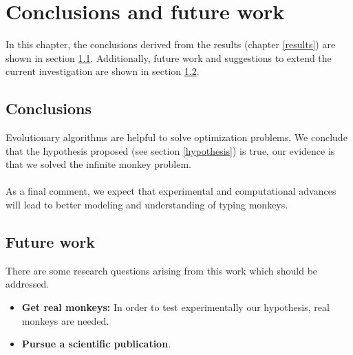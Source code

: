 \chapter{Conclusions and future work} \label{conclusions}

In this chapter, the conclusions derived from the results 
(chapter \ref{results}) are shown in section \ref{section_conclusions}. 
Additionally, future work and suggestions to extend the current investigation are shown in 
section \ref{section_future_work}. 

\section{Conclusions} \label{section_conclusions}

Evolutionary algorithms are helpful to solve optimization problems. 
We conclude that the hypothesis proposed (see section \ref{hypothesis}) is true, our 
evidence is that we solved the infinite monkey problem. 
\\
\\
As a final comment, we expect that experimental and computational 
advances will lead to better modeling and understanding of typing monkeys. 

\section{Future work} \label{section_future_work}

There are some research questions arising from this work which should be addressed.

\begin{itemize}
	\item \textbf{Get real monkeys:} In order 
	to test experimentally our hypothesis, real monkeys are needed.
	\item \textbf{Pursue a scientific publication}.
\end{itemize}

